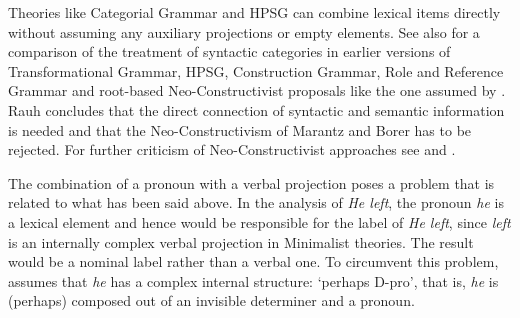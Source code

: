 Theories like Categorial Grammar and HPSG can combine lexical items directly without assuming
any auxiliary projections or empty elements. See also
 for a comparison of the
treatment of syntactic categories in earlier versions of Transformational Grammar, HPSG\indexhpsg,
Construction Grammar\indexcxg, Role and Reference Grammar and root-based Neo-Constructivist proposals like the one assumed
by \citet{Chomsky2013a}. Rauh concludes that the direct connection of syntactic and semantic
information is needed and that the Neo-Constructivism of Marantz and Borer has to be rejected. For
further criticism of Neo-Constructivist approaches see  and .


The combination of a pronoun with a verbal projection poses a problem that is related to what has
been said above. In the analysis of \emph{He left}, the pronoun \emph{he} is a lexical element and
hence would be responsible for the label of \emph{He left}, since \emph{left} is an internally
complex verbal projection in Minimalist theories. The result would be a nominal label rather than a
verbal one. To circumvent this problem, \citet[]{Chomsky2013a} assumes that \emph{he} has a
complex internal structure: `perhaps D-pro', that is, \emph{he} is (perhaps) composed out of an
invisible determiner and a pronoun.

